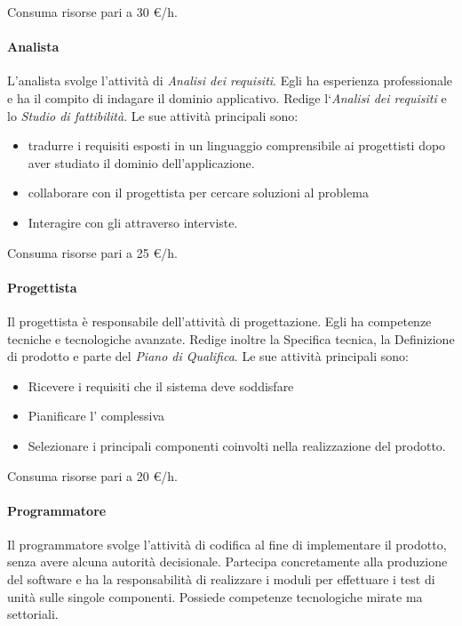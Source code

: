\documentclass[../norme-di-progetto.tex]{subfiles}
\begin{document}
Consuma risorse pari a 30 €/h.

\paragraph{Analista}%
\label{par:analista}
L'analista svolge l'attività di \textit{Analisi dei requisiti}.
Egli ha esperienza professionale e ha il compito di indagare il dominio applicativo.
Redige l`\textit{Analisi dei requisiti} e lo \textit{Studio di fattibilità}. Le sue attività principali sono:

\begin{itemize}
  \item tradurre i requisiti esposti in un linguaggio comprensibile ai progettisti dopo aver studiato il dominio dell'applicazione.
  \item collaborare con il progettista per cercare soluzioni al problema
  \item Interagire con gli  attraverso interviste.
\end{itemize}

Consuma risorse pari a 25 €/h.

\paragraph{Progettista}%
\label{par:progettista}
Il progettista è responsabile dell'attività di progettazione.
Egli ha competenze tecniche e tecnologiche avanzate.
Redige inoltre la Specifica tecnica, la Definizione di prodotto e parte del \textit{Piano di Qualifica}.
Le sue attività principali sono:

\begin{itemize}
  \item Ricevere i requisiti che il sistema deve soddisfare
  \item Pianificare l' complessiva
  \item Selezionare i principali componenti coinvolti nella realizzazione del prodotto.
\end{itemize}

Consuma risorse pari a 20 €/h.

\paragraph{Programmatore}%
\label{par:programmatore}
Il programmatore svolge l'attività di codifica al fine di implementare il prodotto, senza avere alcuna autorità decisionale.
Partecipa concretamente alla produzione del software e ha la responsabilità di realizzare i moduli per effettuare i test di unità sulle singole componenti.
Possiede competenze tecnologiche mirate ma settoriali.
\end{document}
